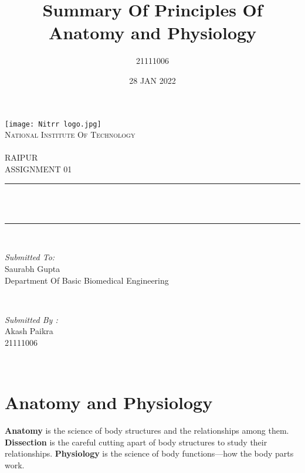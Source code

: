 \documentclass[12pt]{article}
\title{Summary Of Principles Of Anatomy and Physiology}
\author{21111006}
\date{28 JAN 2022}
\makeatletter
\let\thetitle\@title
\makeatother
\begin{document}
\begin{titlepage}
	\centering
    \texttt{[image: Nitrr logo.jpg]}\\[1.0 cm]	
    \textsc{\LARGE National Institute Of Technology \newline\\\\ RAIPUR}\\[2.0 CM]
    
	\textsc{\Large ASSIGNMENT 01}\\[0.5 cm]				%
	\rule{\linewidth}{0.4 mm} \\[0.4 cm]
	{ \huge \bfseries \thetitle}\\
	\rule{\linewidth}{0.4 mm} \\[1.5 cm]
	
	\begin{minipage}{0.6\textwidth}
		\begin{flushleft} \large
			\emph{Submitted To:}\\
			Saurabh Gupta\\
            Department Of Basic Biomedical Engineering\\
			\end{flushleft}
			\end{minipage}~
			\begin{minipage}{0.4\textwidth}
            
			\begin{flushright} \large
			\emph{Submitted By :}\\
			Akash Paikra\\
            21111006\\
		\end{flushright}
        
	\end{minipage}\\[2 cm]
\end{titlepage}

\tableofcontents
\pagebreak

\section{Anatomy and Physiology}
\textbf{Anatomy} is the science of body structures and the relationships among them.\newline
\textbf{Dissection} is the careful cutting apart of body structures to study their relationships.\newline
\textbf{Physiology} is the science of body functions—how the body parts work.
\end{document}

